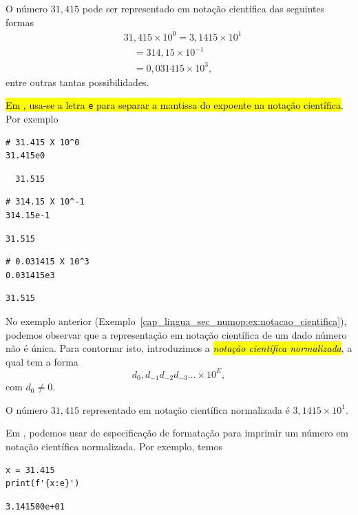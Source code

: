 \begin{ex}\label{cap_lingua_sec_numop:ex:notacao_cientifica}
  O número $31,415$ pode ser representado em notação científica das seguintes formas
  \begin{align}
    & 31,415\times 10^0 = 3,1415\times 10^{1} \\
    & \text{}\quad = 314,15\times 10^{-1} \\
    & \text{}\quad = 0,031415\times 10^{3},
  \end{align}
  entre outras tantas possibilidades.

  \hl{Em {\python}, usa-se a letra \texttt{e} para separar a mantissa do expoente na notação científica}. Por exemplo

\begin{lstlisting}
# 31.415 X 10^0
31.415e0  
\end{lstlisting}

\begin{verbatim}
  31.515
\end{verbatim}

\begin{lstlisting}
# 314.15 X 10^-1
314.15e-1
\end{lstlisting}  

\begin{verbatim}
31.515  
\end{verbatim}

\begin{lstlisting}
# 0.031415 X 10^3
0.031415e3    
\end{lstlisting}

\begin{verbatim}
31.515  
\end{verbatim}
  
\end{ex}

No exemplo anterior (Exemplo~\ref{cap_lingua_sec_numop:ex:notacao_cientifica}), podemos observar que a representação em notação científica de um dado número não é única. Para contornar isto, introduzimos a \hl{\emph{notação científica normalizada}}, a qual tem a forma
\begin{equation}
  d_0,d_{-1}d_{-2}d_{-3}\ldots\times 10^{E},
\end{equation}
com $d_0 \neq 0$.

\begin{ex}
  O número $31,415$ representado em notação científica normalizada é $3,1415\times 10^{1}$.

  Em {\python}, podemos usar de especificação de formatação para imprimir um número em notação científica normalizada. Por exemplo, temos

\begin{lstlisting}
x = 31.415
print(f'{x:e}')
\end{lstlisting}

\begin{verbatim}
3.141500e+01
\end{verbatim}

\end{ex}

